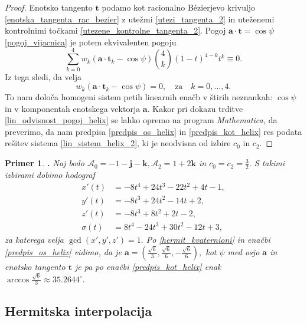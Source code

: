 \documentclass[12pt,a4paper,twoside]{article}
\theoremstyle{definition} %
\theoremstyle{plain} %
\theoremstyle{primerstyle}
\newtheorem{primer}[definicija]{Primer}
\numberwithin{equation}{section}  %
\newcommand{\tV}{\mathbf{t}}
\newcommand{\aV}{\mathbf{a}}
\newcommand{\jV}{\mathbf{j}}
\newcommand{\kV}{\mathbf{k}}
\newcommand{\AQ}{\mathcal{A}}
\begin{document}
\begin{proof}
	Enotsko tangento $\tV$ podamo kot racionalno Bézierjevo krivuljo \eqref{enotska_tangenta_rac_bezier} z utežmi \eqref{utezi_tangenta_2} in uteženemi kontrolnimi točkami \eqref{utezene_kontrolne_tangenta_2}. Pogoj $\aV\cdot\tV=\cos\psi$ \eqref{pogoj_vijacnica} je potem ekvivalenten pogoju
	\begin{equation}
		\label{lin_sistem_helix}
		\sum_{k=0}^4w_k(\aV\cdot\tV_k-\cos\psi)\binom{4}{k}(1-t)^{4-k}t^k\equiv0.
	\end{equation}
	Iz tega sledi, da velja
	\begin{equation}
		\label{lin_sistem_helix_2}
		w_k(\aV\cdot\tV_k-\cos\psi)=0,\quad\text{za}\quad k=0,\dots,4.
	\end{equation}
	To nam določa homogeni sistem petih linearnih enačb v štirih neznankah: $\cos\psi$ in v komponentah enotskega vektorja $\aV.$ Kakor pri dokazu trditve \ref{lin_odvisnost_pogoj_helix} se lahko opremo na program \emph{Mathematica,} da preverimo, da nam predpisa  \eqref{predpis_os_helix} in \eqref{predpis_kot_helix} res podata rešitev sistema \eqref{lin_sistem_helix_2}, ki je neodvisna od izbire $c_0$ in $c_2.$
\end{proof}
\begin{primer}
	\textbf{. }Naj bodo $\AQ_0=-1-\jV-\kV,\AQ_2=1+2\kV$ in $c_0=c_2=\frac{3}{2}.$ S takimi izbirami dobimo hodograf
	\begin{align*}
		x'(t)&=-8t^4+24t^3-22t^2+4t-1,\\
		y'(t)&=-8t^3+24t^2-14t+2,\\
		z'(t)&=-8t^3+8 t^2+2 t-2,\\
		\sigma(t)&=8t^4-24t^3+30t^2-12t+3,
	\end{align*}
	za katerega velja $\gcd(x',y',z')=1.$ Po \eqref{hermit_kvaternioni} in enačbi \eqref{predpis_os_helix} vidimo, da je $\aV=(\frac{\sqrt{6}}{3},\frac{\sqrt{6}}{6},-\frac{\sqrt{6}}{6}),$ kot $\psi$ med osjo $\aV$ in enotsko tangento $\tV$ je pa po enačbi \eqref{predpis_kot_helix} enak $\arccos\frac{\sqrt{6}}{3}\approx35.2644^\circ.$
\end{primer}

\subsection{Hermitska interpolacija}
\end{document}
